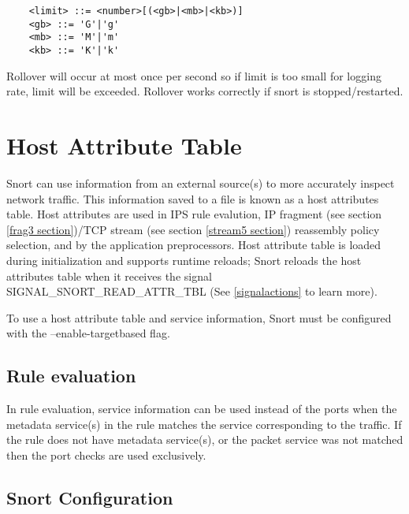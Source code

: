\documentclass[english]{report}
\newenvironment{note}{
\samepage
    \vspace{10pt}{\textsf{
        {\hspace{7pt}\Huge{$\triangle$\hspace{-12.5pt}{\Large{$^!$}}}}\hspace{5pt}
        {\Large{NOTE}}
    }
    }
   \begin{center}
    \par\vspace{-17pt}

    \begin{lrbox}{\savepar}
    \begin{minipage}[r]{6in}
}
{
    \end{minipage}
    \end{lrbox}
    \fbox{
        \usebox{
            \savepar
	}
    }
    \par\vskip10pt
    \end{center}
}
\newenvironment{note}{
        \begin{rawhtml}
        <p><table border="1"><tr><td><b>
        Note:&nbsp;&nbsp;</b>
        \end{rawhtml}
}{
        \begin{rawhtml}
        </b></td></tr></table></p>
        \end{rawhtml}
}
\begin{document}
\begin{verbatim}
    <limit> ::= <number>[(<gb>|<mb>|<kb>)]
    <gb> ::= 'G'|'g'
    <mb> ::= 'M'|'m'
    <kb> ::= 'K'|'k'
\end{verbatim}

Rollover will occur at most once per second so if limit is too small for
logging rate, limit will be exceeded.  Rollover works correctly if snort is
stopped/restarted.

\section{Host Attribute Table}
\label{targetbased}

Snort can use information from an external source(s) to more accurately inspect
network traffic. This information saved to a file is known as a host attributes
table. Host attributes are used in IPS rule evalution, IP fragment (see section
\ref{frag3 section})/TCP stream (see section \ref{stream5 section}) reassembly
policy selection, and by the application preprocessors. Host attribute table is
loaded during initialization and supports runtime reloads; Snort reloads the
host attributes table when it receives the signal SIGNAL\_SNORT\_READ\_ATTR\_TBL
(See \ref{signalactions} to learn more).

\begin{note}
To use a host attribute table and service information, Snort must be configured
with the --enable-targetbased flag.
\end{note}

\subsection{Rule evaluation}

In rule evaluation, service information can be used instead of the ports when the
metadata service(s) in the rule matches the service corresponding to the traffic.
If the rule does not have metadata service(s), or the packet service was not
matched then the port checks are used exclusively.

\subsection{Snort Configuration}
\end{document}
